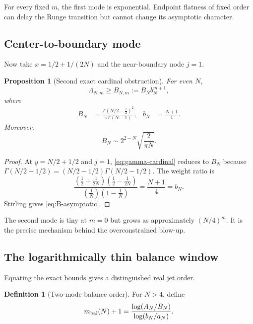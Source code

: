 \documentclass[11pt,oneside]{article}
\numberwithin{equation}{section}
\newtheorem{proposition}[theorem]{Proposition}
\theoremstyle{definition}
\newtheorem{definition}[theorem]{Definition}
\theoremstyle{remark}
\newcommand{\Leb}{\Lambda}
\begin{document}
For every fixed $m$, the first mode is exponential.  Endpoint flatness of fixed order can
delay the Runge transition but cannot change its asymptotic character.

\subsection{Center-to-boundary mode}

Now take $x=1/2+1/(2N)$ and the near-boundary node $j=1$.

\begin{proposition}[Second exact cardinal obstruction]
\label{prop:B-mode}
For even $N$,
\begin{equation}
 \Leb_{N,m}\ge B_{N,m}:=B_Nb_N^{m+1},
 \label{eq:B-mode}
\end{equation}
where
\begin{align}
 B_N&=\frac{\Gamma(N/2-\tfrac12)^2}{\pi\Gamma(N-1)},
 &b_N&=\frac{N+1}{4}.
 \label{eq:B-components}
\end{align}
Moreover,
\begin{equation}
 B_N\sim 2^{2-N}\sqrt{\frac{2}{\pi N}}.
 \label{eq:B-asymptotic}
\end{equation}
\end{proposition}

\begin{proof}
At $y=N/2+1/2$ and $j=1$, \eqref{eq:gamma-cardinal} reduces to $B_N$ because
$\Gamma(N/2+1/2)=(N/2-1/2)\Gamma(N/2-1/2)$.  The weight ratio is
\[
 \frac{(\frac12+\frac1{2N})(\frac12-\frac1{2N})}
 {(\frac1N)(1-\frac1N)}=\frac{N+1}{4}=b_N.
\]
Stirling gives \eqref{eq:B-asymptotic}.
\end{proof}

The second mode is tiny at $m=0$ but grows as approximately $(N/4)^m$.  It is the precise
mechanism behind the overconstrained blow-up.

\subsection{The logarithmically thin balance window}

Equating the exact bounds gives a distinguished real jet order.

\begin{definition}[Two-mode balance order]
\label{def:balance}
For $N>4$, define
\begin{equation}
 m_{\rm bal}(N)+1=
 \frac{\log(A_N/B_N)}{\log(b_N/a_N)}.
 \label{eq:balance-order}
\end{equation}
\end{definition}
\end{document}
